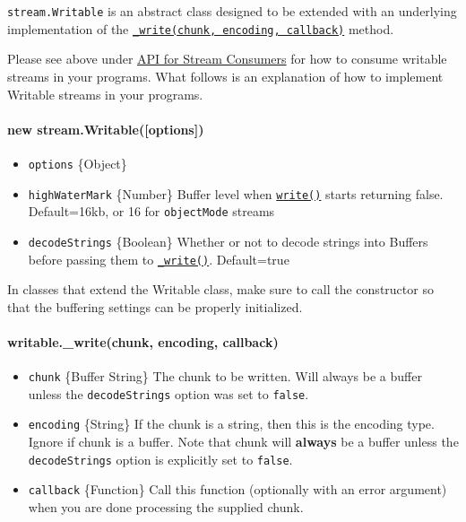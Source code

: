 \texttt{stream.Writable} is an abstract class designed to be extended
with an underlying implementation of the
\hyperref[streamux5fwritableux5fwriteux5fchunkux5fencodingux5fcallbackux5f1]{\texttt{\_write(chunk, encoding, callback)}}
method.

Please see above under
\hyperref[streamux5fapiux5fforux5fstreamux5fconsumers]{API for Stream
Consumers} for how to consume writable streams in your programs. What
follows is an explanation of how to implement Writable streams in your
programs.

\paragraph{new
stream.Writable({[}options{]})}\label{new-stream.writableoptions}

\begin{itemize}
\itemsep1pt\parskip0pt
\item
  \texttt{options} \{Object\}
\item
  \texttt{highWaterMark} \{Number\} Buffer level when
  \hyperref[streamux5fwritableux5fwriteux5fchunkux5fencodingux5fcallback]{\texttt{write()}}
  starts returning false. Default=16kb, or 16 for \texttt{objectMode}
  streams
\item
  \texttt{decodeStrings} \{Boolean\} Whether or not to decode strings
  into Buffers before passing them to
  \hyperref[streamux5fwritableux5fwriteux5fchunkux5fencodingux5fcallbackux5f1]{\texttt{\_write()}}.
  Default=true
\end{itemize}

In classes that extend the Writable class, make sure to call the
constructor so that the buffering settings can be properly initialized.

\paragraph{writable.\_write(chunk, encoding,
callback)}\label{writable.ux5fwritechunk-encoding-callback}

\begin{itemize}
\itemsep1pt\parskip0pt
\item
  \texttt{chunk} \{Buffer \textbar{} String\} The chunk to be written.
  Will always be a buffer unless the \texttt{decodeStrings} option was
  set to \texttt{false}.
\item
  \texttt{encoding} \{String\} If the chunk is a string, then this is
  the encoding type. Ignore if chunk is a buffer. Note that chunk will
  \textbf{always} be a buffer unless the \texttt{decodeStrings} option
  is explicitly set to \texttt{false}.
\item
  \texttt{callback} \{Function\} Call this function (optionally with an
  error argument) when you are done processing the supplied chunk.
\end{itemize}

